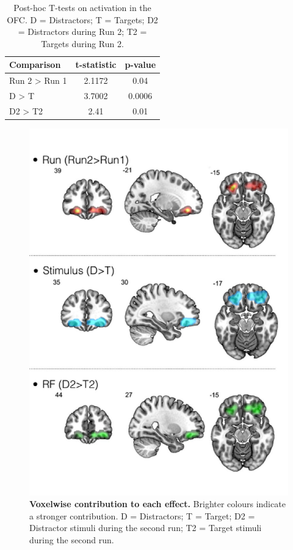 \begin{table} 
\vspace{20px}
\begin{center}
\begin{tabular}{ ||l||c c || } 

  \hline
\rowcolor{BabyBlue}
Comparison & t-statistic & p-value\\
  \hline
  \hline
Run 2 > Run 1   & 2.1172 & 0.04 \\ 
  \hline
D > T  & 3.7002   & 0.0006  \\ 
  \hline
D2 > T2  & 2.41 & 0.01 \\ 

 \hline
\end{tabular}

\end{center}
\caption{Post-hoc T-tests on activation in the OFC. D = Distractors; T = Targets; D2 = Distractors during Run 2; T2 = Targets during Run 2. } \label{tbl:posthoc}
\end{table}



\begin{figure}[h]
\centering\includegraphics[width=0.7\linewidth]{images/Ch4/Figure5_voxelwise.pdf}
\caption{\textbf{Voxelwise contribution to each effect. } Brighter colours indicate a stronger contribution. D = Distractors; T = Target; D2 = Distractor stimuli during the second run; T2 = Target stimuli during the second run.} \label{fig:voxelwise}
\end{figure}




